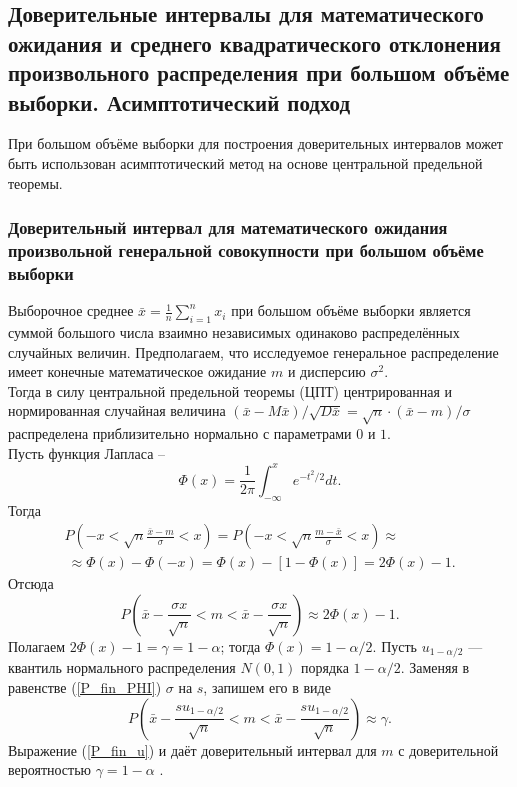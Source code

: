 \documentclass[../body.tex]{subfiles}
\begin{document}
\subsection{Доверительные интервалы для математического ожидания и среднего квадратического отклонения произвольного распределения при большом объёме выборки. Асимптотический подход}
При большом объёме выборки для построения доверительных интервалов может быть использован асимптотический метод на основе центральной предельной теоремы.
\subsubsection{Доверительный интервал для математического ожидания произвольной генеральной совокупности при большом объёме выборки}
Выборочное среднее $\bar{x} = \frac{1}{n}\sum_{i = 1}^{n}{x_{i}}$ при большом объёме выборки является суммой большого числа взаимно независимых одинаково распределённых случайных величин. Предполагаем, что исследуемое генеральное распределение имеет конечные математическое ожидание $m$ и дисперсию $\sigma^{2}$.\\ Тогда в силу центральной предельной теоремы (ЦПТ) центрированная и нормированная случайная величина $(\bar{x} - M\bar{x}) / \sqrt{D\bar{x}} = \sqrt{n}·(\bar{x}-m)/\sigma$ распределена приблизительно нормально с параметрами $0$ и $1$.\\ Пусть функция Лапласа -- 
\begin{equation}
	\Phi(x) = \frac{1}{2\pi}\int_{-\infty}^{x}{e^{-t^{2}/2}dt}.
	\label{f_lapl}
\end{equation} Тогда
\begin{multline}
	P\left(-x < \sqrt{n}\frac{\bar{x} - m}{\sigma} < x \right) = 
	P\left(-x < \sqrt{n}\frac{m - \bar{x}}{\sigma} < x \right) \approx \\\
	\approx \Phi(x) - \Phi(-x)=\Phi(x) - [1 - \Phi(x)] = 2\Phi(x) - 1.
	\label{P_PHI}
\end{multline}
Отсюда
\begin{equation}
	P\left(\bar{x} - \frac{\sigma x}{\sqrt{n}} < m < \bar{x} - \frac{\sigma x}{\sqrt{n}} \right) \approx 2\Phi(x) - 1.
	\label{P_fin_PHI}
\end{equation}
Полагаем $2\Phi(x) - 1 = \gamma = 1 - \alpha$; тогда $\Phi(x) = 1 - \alpha/2$. Пусть $u_{1-\alpha/2}$ — квантиль нормального распределения $N(0,1)$ порядка $1-\alpha/2$. Заменяя в равенстве (\ref{P_fin_PHI}) $\sigma$ на $s$, запишем его в виде
\begin{equation}
	P\left(\bar{x} - \frac{su_{1-\alpha/2}}{\sqrt{n}} < m < \bar{x} - \frac{su_{1-\alpha/2}}{\sqrt{n}} \right) \approx \gamma.
	\label{P_fin_u}
\end{equation}
Выражение (\ref{P_fin_u}) и даёт доверительный интервал для $m$ с доверительной вероятностью $\gamma = 1-\alpha$ \cite[c.~460]{max}.
\end{document}

